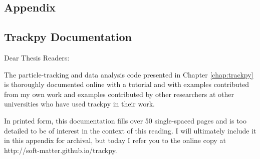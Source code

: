 \begin{appendices}
\chapter{Appendix}

\section{Trackpy Documentation}

\noindent Dear Thesis Readers:

The particle-tracking and data analysis code presented in Chapter \ref{chap:trackpy} is thoroughly documented online with a tutorial and with examples contributed from my own work and examples contributed by other researchers at other universities who have used trackpy in their work.

In printed form, this documentation fills over 50 single-spaced pages and is too detailed to be of interest in the context of this reading. I will ultimately include it in this appendix for archival, but today I refer you to the online copy at http://soft-matter.github.io/trackpy.

\end{appendices}